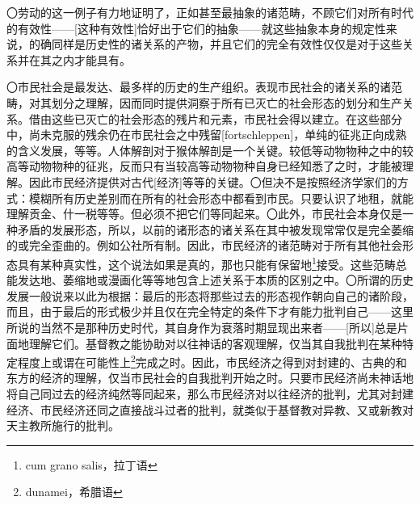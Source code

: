 \documentclass[a4paper,twoside,12pt]{ctexart}
\begin{document}
〇劳动的这一例子有力地证明了，正如甚至最抽象的诸范畴，不顾它们对所有时代的有效性——[这种有效性]恰好出于它们的抽象——就这些抽象本身的规定性来说，的确同样是历史性的诸关系的产物，并且它们的完全有效性仅仅是对于这些关系并在其之内才能具有。

〇市民社会是最发达、最多样的历史的生产组织。表现市民社会的诸关系的诸范畴，对其划分之理解，因而同时提供洞察于所有已灭亡的社会形态的划分和生产关系。借由这些已灭亡的社会形态的残片和元素，市民社会得以建立。在这些部分中，尚未克服的残余仍在市民社会之中残留[fortschleppen]，单纯的征兆正向成熟的含义发展，等等。人体解剖对于猴体解剖是一个关键。较低等动物物种之中的较高等动物物种的征兆，反而只有当较高等动物物种自身已经知悉了之时，才能被理解。因此市民经济提供对古代[经济]等等的关键。〇但决不是按照经济学家们的方式：模糊所有历史差别而在所有的社会形态中都看到市民。只要认识了地租，就能理解贡金、什一税等等。但必须不把它们等同起来。〇此外，市民社会本身仅是一种矛盾的发展形态，所以，以前的诸形态的诸关系在其中被发现常常仅是完全萎缩的或完全歪曲的。例如公社所有制。因此，市民经济的诸范畴对于所有其他社会形态具有某种真实性，这个说法如果是真的，那也只能有保留地\footnote{cum grano salis，拉丁语}接受。这些范畴总能发达地、萎缩地或漫画化等等地包含上述关系于本质的区别之中。〇所谓的历史发展一般说来以此为根据：最后的形态将那些过去的形态视作朝向自己的诸阶段，而且，由于最后的形式极少并且仅在完全特定的条件下才有能力批判自己——这里所说的当然不是那种历史时代，其自身作为衰落时期显现出来者——[所以]总是片面地理解它们。基督教之能协助对以往神话的客观理解，仅当其自我批判在某种特定程度上或谓在可能性上\footnote{dunamei，希腊语}完成之时。因此，市民经济之得到对封建的、古典的和东方的经济的理解，仅当市民社会的自我批判开始之时。只要市民经济尚未神话地将自己同过去的经济纯然等同起来，那么市民经济对以往经济的批判，尤其对封建经济、市民经济还同之直接战斗过者的批判，就类似于基督教对异教、又或新教对天主教所施行的批判。
\end{document}
